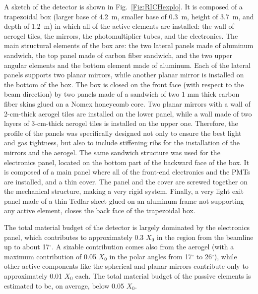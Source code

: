 \documentclass[5p,times,twocolumn]{elsarticle}
\begin{document}
A sketch of the detector is shown in Fig.~\ref{Fig:RICHexplo}. It is composed of a trapezoidal box (larger base of
4.2~m, smaller base of 0.3~m, height of 3.7~m, and depth of 1.2~m) in which all of the active elements are installed:
the wall of aerogel tiles, the mirrors, the photomultiplier tubes, and the electronics. The main structural elements of
the box are: the two lateral panels made of aluminum sandwich, the top panel made of carbon fiber sandwich, and the
two upper angular elements and the bottom element made of aluminum. Each of the lateral panels supports two planar
mirrors, while another planar mirror is installed on the bottom of the box. The box is closed on the front face (with
respect to the beam direction) by two panels made of a sandwich of two 1 mm thick carbon fiber skins glued on a
Nomex honeycomb core. Two planar mirrors with a wall of 2-cm-thick aerogel tiles are installed on the lower panel, while
a wall made of two layers of 3-cm-thick aerogel tiles is installed on the upper one. Therefore, the profile of the panels
was specifically designed not only to ensure the best light and gas tightness, but also to include stiffening ribs for
the installation of the mirrors and the aerogel. The same sandwich structure was used for the electronics panel, located
on the bottom part of the backward face of the box. It is composed of a main panel where all of the front-end electronics
and the PMTs are installed, and a thin cover. The panel and the cover are screwed together on the mechanical
structure, making a very rigid system. Finally, a very light exit panel made of a thin Tedlar sheet glued on an aluminum
frame not supporting any active element, closes the back face of the trapezoidal box. 

The total material budget of the detector is largely dominated by the electronics panel, which contributes to
approximately 0.3 $X_0$ in the region from the beamline up to about 17$^\circ$. A sizable contribution comes also
from the aerogel (with a maximum contribution of 0.05 $X_0$ in the polar angles from 17$^\circ$ to 26$^\circ$),
while other active components like the spherical and planar mirrors contribute only to approximately 0.01 $X_0$ each.
The total material budget of the passive elements is estimated to be, on average, below 0.05 $X_0$.
\end{document}
